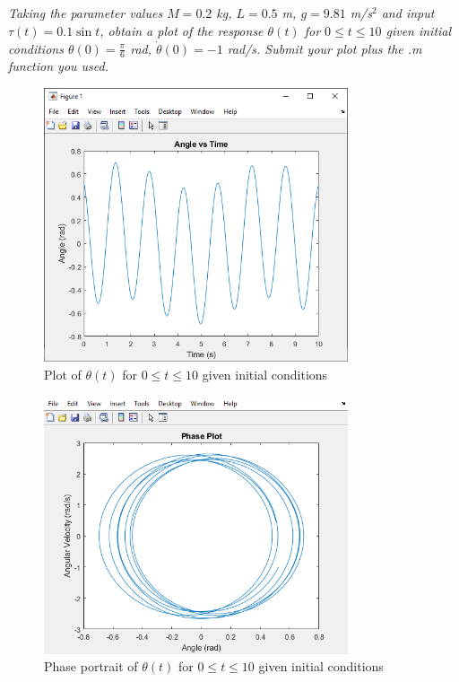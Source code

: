 \subsection{}

\textit{Taking the parameter values $M = 0.2$ kg, $L = 0.5$ m, $g = 9.81$ m/s$^2$ and input $\tau(t) = 0.1 \sin t$, 
obtain a plot of the response $\theta(t)$ for $0 \leq t \leq 10$ given initial conditions 
$\theta(0) = \frac{\pi}{6}$ rad, $\dot{\theta}(0) = -1$ rad/s. Submit your plot plus the .m function you used.}

\begin{figure}[h]
    \centering
    \includegraphics[width=0.8\textwidth]{Questions/Plots/Q1CAngleVsTime.png}
    \caption{Plot of $\theta(t)$ for $0 \leq t \leq 10$ given initial conditions}
    \label{fig:Q1c}
\end{figure}

\begin{figure}[h]
    \centering
    \includegraphics[width=0.8\textwidth]{Questions/Plots/Q1CPhasePlot.png}
    \caption{Phase portrait of $\theta(t)$ for $0 \leq t \leq 10$ given initial conditions}
    \label{fig:Q1cPhasePortrait}
\end{figure}


